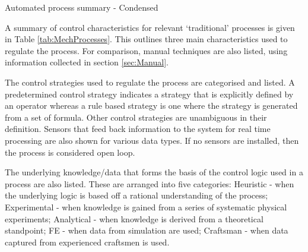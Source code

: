 \renewcommand{\arraystretch}{1.2} 
\begin{table}[h] 
    \centering
    \resizebox{\linewidth}{!}{
        
        }
    \caption{Automated process summary - Condensed }
    \label{tab:MechProcesses}
\end{table}

A summary of control characteristics for relevant `traditional' processes is given in Table \ref{tab:MechProcesses}. This outlines three main characteristics used to regulate the process. For comparison, manual techniques are also listed, using information collected in section \ref{sec:Manual}.
 

The control strategies used to regulate the process are categorised and listed. A predetermined control strategy indicates a strategy that is explicitly defined by an operator whereas a rule based strategy is one where the strategy is generated from a set of formula. Other control strategies are unambiguous in their definition. Sensors that feed back information to the system for real time processing are also shown for various data types. If no sensors are installed, then the process is considered open loop.


The underlying knowledge/data that forms the basis of the control logic used in a process are also listed. These are arranged into five categories: Heuristic - when the underlying logic is based off a rational understanding of the process; Experimental - when knowledge is gained from a series of systematic physical experiments; Analytical - when knowledge is derived from a theoretical standpoint; FE - when data from simulation are used; Craftsman - when data captured from experienced craftsmen is used.


